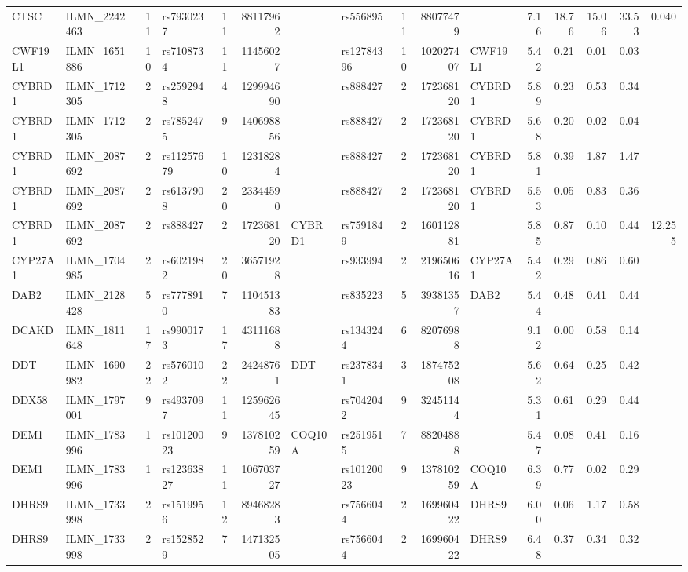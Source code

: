 \documentclass{article}
\begin{document}
\begin{landscape}
{\begin{ThreePartTable}
\begin{longtable}{|llr|lrrl|lrrl|rrrr|r|}
CTSC & ILMN\_2242463 & 11 & rs7930237 & 11 & 88117962 &  & rs556895 & 11 & 88077479 &  & 7.16 & 18.76 & 15.06 & 33.53 & 0.040 \\
CWF19L1 & ILMN\_1651886 & 10 & rs7108734 & 11 & 11456027 &  & rs12784396 & 10 & 102027407 & CWF19L1 & 5.42 & 0.21 & 0.01 & 0.03 &  \\
CYBRD1 & ILMN\_1712305 & 2 & rs2592948 & 4 & 129994690 &  & rs888427 & 2 & 172368120 & CYBRD1 & 5.89 & 0.23 & 0.53 & 0.34 &  \\
CYBRD1 & ILMN\_1712305 & 2 & rs7852475 & 9 & 140698856 &  & rs888427 & 2 & 172368120 & CYBRD1 & 5.68 & 0.20 & 0.02 & 0.04 &  \\
CYBRD1 & ILMN\_2087692 & 2 & rs11257679 & 10 & 12318284 &  & rs888427 & 2 & 172368120 & CYBRD1 & 5.81 & 0.39 & 1.87 & 1.47 &  \\
CYBRD1 & ILMN\_2087692 & 2 & rs6137908 & 20 & 23344590 &  & rs888427 & 2 & 172368120 & CYBRD1 & 5.53 & 0.05 & 0.83 & 0.36 &  \\
CYBRD1 & ILMN\_2087692 & 2 & rs888427 & 2 & 172368120 & CYBRD1 & rs7591849 & 2 & 160112881 &  & 5.85 & 0.87 & 0.10 & 0.44 & 12.255 \\
CYP27A1 & ILMN\_1704985 & 2 & rs6021982 & 20 & 36571928 &  & rs933994 & 2 & 219650616 & CYP27A1 & 5.42 & 0.29 & 0.86 & 0.60 &  \\
DAB2 & ILMN\_2128428 & 5 & rs7778910 & 7 & 110451383 &  & rs835223 & 5 & 39381357 & DAB2 & 5.44 & 0.48 & 0.41 & 0.44 &  \\
DCAKD & ILMN\_1811648 & 17 & rs9900173 & 17 & 43111688 &  & rs1343244 & 6 & 82076988 &  & 9.12 & 0.00 & 0.58 & 0.14 &  \\
DDT & ILMN\_1690982 & 22 & rs5760102 & 22 & 24248761 & DDT & rs2378341 & 3 & 187475208 &  & 5.62 & 0.64 & 0.25 & 0.42 &  \\
DDX58 & ILMN\_1797001 & 9 & rs4937097 & 11 & 125962645 &  & rs7042042 & 9 & 32451144 &  & 5.31 & 0.61 & 0.29 & 0.44 &  \\
DEM1 & ILMN\_1783996 & 1 & rs10120023 & 9 & 137810259 & COQ10A & rs2519515 & 7 & 88204888 &  & 5.47 & 0.08 & 0.41 & 0.16 &  \\
DEM1 & ILMN\_1783996 & 1 & rs12363827 & 11 & 106703727 &  & rs10120023 & 9 & 137810259 & COQ10A & 6.39 & 0.77 & 0.02 & 0.29 &  \\
DHRS9 & ILMN\_1733998 & 2 & rs1519956 & 12 & 89468283 &  & rs7566044 & 2 & 169960422 & DHRS9 & 6.00 & 0.06 & 1.17 & 0.58 &  \\
DHRS9 & ILMN\_1733998 & 2 & rs1528529 & 7 & 147132505 &  & rs7566044 & 2 & 169960422 & DHRS9 & 6.48 & 0.37 & 0.34 & 0.32 &  \\

\end{longtable}
\end{ThreePartTable}}
\end{landscape}
\end{document}
